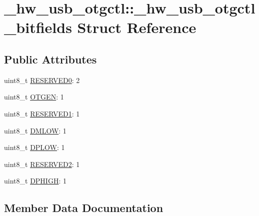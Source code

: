\hypertarget{struct__hw__usb__otgctl_1_1__hw__usb__otgctl__bitfields}{}\section{\+\_\+hw\+\_\+usb\+\_\+otgctl\+:\+:\+\_\+hw\+\_\+usb\+\_\+otgctl\+\_\+bitfields Struct Reference}
\label{struct__hw__usb__otgctl_1_1__hw__usb__otgctl__bitfields}
\subsection*{Public Attributes}
\begin{DoxyCompactItemize}
\item 
uint8\+\_\+t \hyperlink{struct__hw__usb__otgctl_1_1__hw__usb__otgctl__bitfields_ae43a957ddb3ecb5744e74f27db407074}{R\+E\+S\+E\+R\+V\+E\+D0}\+: 2
\item 
uint8\+\_\+t \hyperlink{struct__hw__usb__otgctl_1_1__hw__usb__otgctl__bitfields_a6631c60ca75263b958f61d9219ad1924}{O\+T\+G\+EN}\+: 1
\item 
uint8\+\_\+t \hyperlink{struct__hw__usb__otgctl_1_1__hw__usb__otgctl__bitfields_ac6de18780b7671dfc2f7079b78287d75}{R\+E\+S\+E\+R\+V\+E\+D1}\+: 1
\item 
uint8\+\_\+t \hyperlink{struct__hw__usb__otgctl_1_1__hw__usb__otgctl__bitfields_a3072a8fb796aecfa8125d5be4241f737}{D\+M\+L\+OW}\+: 1
\item 
uint8\+\_\+t \hyperlink{struct__hw__usb__otgctl_1_1__hw__usb__otgctl__bitfields_a2d9884504ae9cfdd586b5b4897f12e77}{D\+P\+L\+OW}\+: 1
\item 
uint8\+\_\+t \hyperlink{struct__hw__usb__otgctl_1_1__hw__usb__otgctl__bitfields_a4db6f0c513d7c49f0933e5b9bcccd2fc}{R\+E\+S\+E\+R\+V\+E\+D2}\+: 1
\item 
uint8\+\_\+t \hyperlink{struct__hw__usb__otgctl_1_1__hw__usb__otgctl__bitfields_ad7ea51a10999403e6d7fa4a11588ab40}{D\+P\+H\+I\+GH}\+: 1
\end{DoxyCompactItemize}


\subsection{Member Data Documentation}
